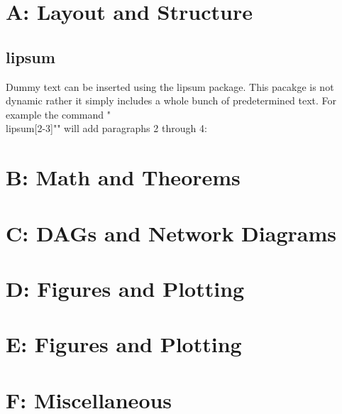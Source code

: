 \documentclass[]{article}
\begin{document}
\section*{A: Layout and Structure}
	
	\subsection{lipsum}
	Dummy text can be inserted using the lipsum package. 
	This pacakge is not dynamic rather it simply includes a whole bunch of predetermined text.
	For example the command "\\lipsum[2-3]"" will add paragraphs 2 through 4:
	
	\lipsum[2-4]
	
\section*{B: Math and Theorems}


\section*{C: DAGs and Network Diagrams}


\section*{D: Figures and Plotting}


\section*{E: Figures and Plotting}


\section*{F: Miscellaneous}
	
\end{document}
